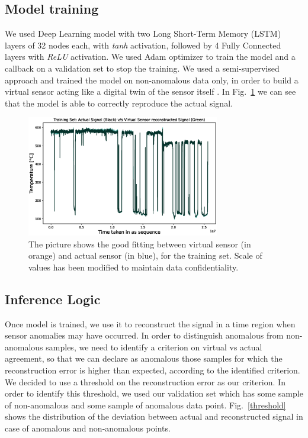 \documentclass[runningheads]{llncs}
\begin{document}
\newpage

\subsection{Model training} 
We used Deep Learning model with two Long Short-Term Memory (LSTM) layers of 32 nodes each, with \textit{tanh}
activation, followed by 4 Fully Connected layers with \textit{ReLU} activation.
We used Adam optimizer to train the model and a callback on a validation set to 
stop the training.
We used a semi-supervised \cite{gori2022} approach and trained the model on non-anomalous data only, in order to build a virtual sensor acting like a digital twin of the sensor itself \cite{malhotra2015}.
In Fig.~\ref{training} we can see that the model is able to correctly reproduce the actual signal.

\begin{figure}[h]
\centering
\includegraphics[width=0.75\textwidth]{myfig.eps}
\caption{The picture shows the good fitting between virtual sensor (in orange) and actual sensor (in blue), for the training set. Scale of values has been modified to maintain data confidentiality.}\label{training}
\end{figure}

\newpage

\subsection{Inference Logic} 
Once model is trained, we use it to reconstruct the signal in a time region when sensor anomalies may have occurred.
In order to distinguish anomalous from non-anomalous samples, we need to identify a criterion on virtual vs actual agreement, so that we can declare as anomalous those samples for which the reconstruction error is higher than expected, according to the identified criterion. We decided to use a threshold on the reconstruction error as our criterion. In order to identify this threshold, we used our validation set which has some sample of non-anomalous and some sample of anomalous data point. Fig.~\ref{threshold} shows the distribution of the deviation between actual and reconstructed signal in case of anomalous and non-anomalous points.
\end{document}
